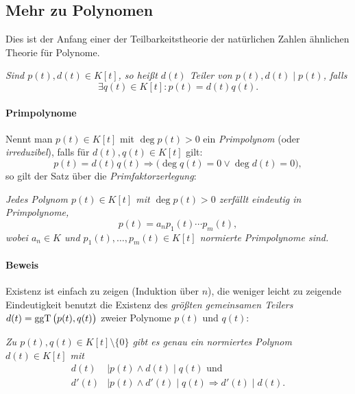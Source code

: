 \subsection{Mehr zu Polynomen}
	Dies ist der Anfang einer der Teilbarkeitstheorie der natürlichen Zahlen ähnlichen Theorie für Polynome.
	
	\begin{Definition}[Teiler]
	\begin{addmargin}{1cm}
		\textit{Sind $ p(t),d(t)\in K[t] $, so heißt $ d(t) $ \emph{Teiler} von $ p(t), d(t)\mid p(t) $, falls
			\[ \exists q(t)\in K[t]: p(t)= d(t)q(t). \]}
	\end{addmargin}
	\end{Definition}
\paragraph{Primpolynome}
\begin{Definition}[Primpolynom]
	Nennt man $ p(t)\in K[t] $ mit $ \deg p(t) > 0$ ein \emph{Primpolynom} (oder \emph{irreduzibel}), falls für $ d(t),q(t)\in K[t] $ gilt:
		\[ p(t)= d(t)q(t) \Rightarrow \Big( \deg q(t)=0 \lor \deg d(t) = 0 \Big), \]
	so gilt der Satz über die \emph{Primfaktorzerlegung}:
\end{Definition}
	\begin{Satz}[Primfaktorzerlegung]
	\begin{addmargin}{1cm}
		\textit{Jedes Polynom $ p(t)\in K[t] $ mit $ \deg p(t)>0 $ zerfällt eindeutig in Primpolynome,
			\[ p(t) = a_n p_1(t) \cdots p_m(t), \]
		wobei $ a_n\in K $ und $ p_1(t),\dots,p_m(t)\in K[t] $ normierte Primpolynome sind.}
	\end{addmargin}
	\end{Satz}
	
\paragraph{Beweis}	
	Existenz ist einfach zu zeigen (Induktion über $ n $), die weniger leicht zu zeigende Eindeutigkeit benutzt die Existenz des \emph{größten gemeinsamen Teilers} $ d(t) = \operatorname{ggT}\big(p(t),q(t)\big) $ zweier Polynome $ p(t) $ und $ q(t) $:
	
	\begin{addmargin}{1cm}
		\textit{Zu $ p(t),q(t) \in K[t]\setminus \{0\} $ gibt es genau ein normiertes Polynom $ d(t)\in K[t] $ mit
			\begin{align*}
				d(t)&\mid p(t)\land d(t)\mid q(t) \text{ und}\\
				d'(t)&\mid p(t)\land d'(t)\mid q(t) \Rightarrow d'(t)\mid d(t).
			\end{align*}}
	\end{addmargin}
